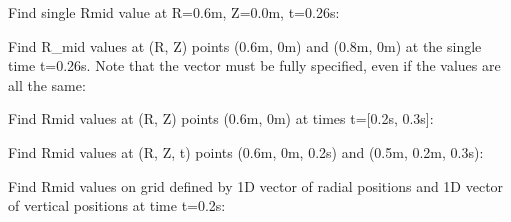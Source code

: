 \documentclass[letterpaper,10pt,english]{sphinxmanual}
\begin{document}
\begin{fulllineitems}
\begin{fulllineitems}
Find single Rmid value at R=0.6m, Z=0.0m, t=0.26s:

\begin{sphinxVerbatim}[commandchars=\\\{\}]
    
\end{sphinxVerbatim}

Find R\_mid values at (R, Z) points (0.6m, 0m) and (0.8m, 0m) at the
single time t=0.26s. Note that the  vector must be fully specified,
even if the values are all the same:

\begin{sphinxVerbatim}[commandchars=\\\{\}]
  \PYG{p}{[} \PYG{p}{]} \PYG{p}{[} \PYG{p}{]} 
\end{sphinxVerbatim}

Find Rmid values at (R, Z) points (0.6m, 0m) at times t={[}0.2s, 0.3s{]}:

\begin{sphinxVerbatim}[commandchars=\\\{\}]
    \PYG{p}{[} \PYG{p}{]}
\end{sphinxVerbatim}

Find Rmid values at (R, Z, t) points (0.6m, 0m, 0.2s) and (0.5m, 0.2m, 0.3s):

\begin{sphinxVerbatim}[commandchars=\\\{\}]
  \PYG{p}{[} \PYG{p}{]} \PYG{p}{[} \PYG{p}{]} \PYG{p}{[} \PYG{p}{]} 
\end{sphinxVerbatim}

Find Rmid values on grid defined by 1D vector of radial positions 
and 1D vector of vertical positions  at time t=0.2s:


\end{fulllineitems}
\end{fulllineitems}
\end{document}
